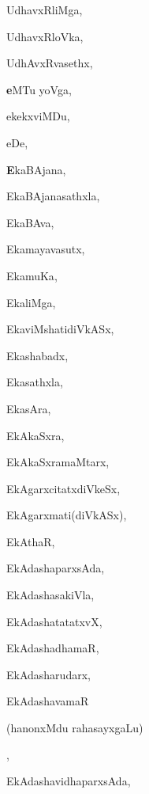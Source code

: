 \begin{multicols}{3}
{\noindent
{UdhavxRliMga}, \pageref{UdhavxRliMga}

\noindent
{UdhavxRloVka}, \pageref{UdhavxRloVka}

\noindent
{UdhAvxRvasethx}, \pageref{UdhAvxRvasethx}

\noindent
{{\large\textbf{e}}MTu yoVga}, \pageref{eMTu yoVga}

\noindent
{ekekxviMDu}, \pageref{ekekxviMDu}

\noindent
{eDe}, \pageref{eDe}

\noindent
{{\large\textbf{E}}kaBAjana}, \pageref{EkaBAjana}

\noindent
{EkaBAjanasathxla}, \pageref{EkaBAjanasathxla}

\noindent
{EkaBAva}, \pageref{EkaBAva}

\noindent
{Ekamayavasutx}, \pageref{Ekamayavasutx}

\noindent
{EkamuKa}, \pageref{EkamuKa}

\noindent
{EkaliMga}, \pageref{EkaliMga}

\noindent
{EkaviMshatidiVkASx}, \pageref{EkaviMshatidiVkASx}

\noindent
{Ekashabadx}, \pageref{Ekashabadx}

\noindent
{Ekasathxla}, \pageref{Ekasathxla}

\noindent
{EkasAra}, \pageref{EkasAra}

\noindent
{EkAkaSxra}, \pageref{EkAkaSxra}

\noindent
{EkAkaSxramaMtarx}, \pageref{EkAkaSxramaMtarx}

\noindent
{EkAgarxcitatxdiVkeSx}, \pageref{EkAgarxcitatxdiVkeSx}

\noindent
{EkAgarxmati(diVkASx)}, \pageref{EkAgarxmati(diVkASx)}

\noindent
{EkAthaR}, \pageref{EkAthaR}

\noindent
{EkAdashaparxsAda}, \pageref{EkAdashaparxsAda}

\noindent
{EkAdashasakiVla}, \pageref{EkAdashasakiVla}

\noindent
{EkAdashatatatxvX}, \pageref{EkAdashatatatxvX}

\noindent
{EkAdashadhamaR}, \pageref{EkAdashadhamaR}

\noindent
{EkAdasharudarx}, \pageref{EkAdasharudarx}

\noindent
{EkAdashavamaR 

\noindent
\qquad (hanonxMdu rahasayxgaLu)}, \pageref{EkAdashavamaR (hanonxMdu rahasayxgaLu)}

\noindent
{EkAdashavidhaparxsAda}, \pageref{EkAdashavidhaparxsAda}

}
\end{multicols}
